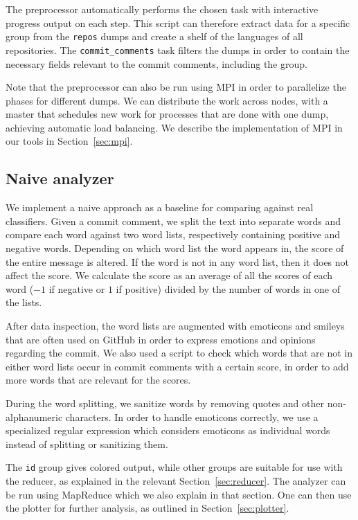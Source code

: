 \documentclass{article}
\begin{document}
The preprocessor automatically performs the chosen task with interactive 
progress output on each step. This script can therefore extract data for 
a specific group from the {\tt repos} dumps and create a shelf of the languages 
of all repositories. The {\tt commit\_comments} task filters the dumps in order 
to contain the necessary fields relevant to the commit comments, including the 
group.

Note that the preprocessor can also be run using MPI in order to parallelize 
the phases for different dumps. We can distribute the work across nodes, with 
a master that schedules new work for processes that are done with one dump, 
achieving automatic load balancing. We describe the implementation of MPI in 
our tools in Section~\ref{sec:mpi}.

\subsection{Naive analyzer}\label{sec:analyzer}

We implement a naive approach as a baseline for comparing against real 
classifiers. Given a commit comment, we split the text into separate words and 
compare each word against two word lists, respectively containing positive and 
negative words. Depending on which word list the word appears in, the score of 
the entire message is altered. If the word is not in any word list, then it 
does not affect the score. We calculate the score as an average of all the 
scores of each word ($-1$ if negative or $1$ if positive) divided by the number 
of words in one of the lists.

After data inspection, the word lists are augmented with emoticons and smileys 
that are often used on GitHub in order to express emotions and opinions 
regarding the commit. We also used a script to check which words that are not 
in either word lists occur in commit comments with a certain score, in order to 
add more words that are relevant for the scores.

During the word splitting, we sanitize words by removing quotes and other 
non-alphanumeric characters. In order to handle emoticons correctly, we use 
a specialized regular expression which considers emoticons as individual words 
instead of splitting or sanitizing them.

The {\tt id} group gives colored output, while other groups are suitable for 
use with the reducer, as explained in the relevant Section~\ref{sec:reducer}. 
The analyzer can be run using MapReduce which we also explain in that section. 
One can then use the plotter for further analysis, as outlined in 
Section~\ref{sec:plotter}.
\end{document}
